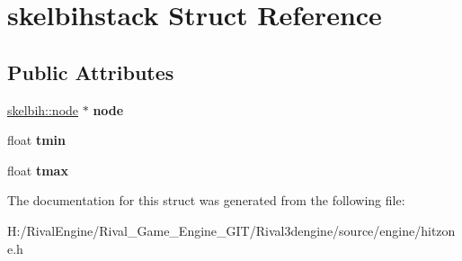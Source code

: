 \hypertarget{structskelbihstack}{}\section{skelbihstack Struct Reference}
\label{structskelbihstack}
\subsection*{Public Attributes}
\begin{DoxyCompactItemize}
\item 
\mbox{\label{structskelbihstack_a61d33e57026131190761a3480039d6e0}} 
\hyperlink{structskelbih_1_1node}{skelbih\+::node} $\ast$ {\bfseries node}
\item 
\mbox{\label{structskelbihstack_a89a0d9b0329a9e9db97fb8d0cb948114}} 
float {\bfseries tmin}
\item 
\mbox{\label{structskelbihstack_a134246276ef5901e9809059f6ac063de}} 
float {\bfseries tmax}
\end{DoxyCompactItemize}


The documentation for this struct was generated from the following file\+:\begin{DoxyCompactItemize}
\item 
H\+:/\+Rival\+Engine/\+Rival\+\_\+\+Game\+\_\+\+Engine\+\_\+\+G\+I\+T/\+Rival3dengine/source/engine/hitzone.\+h\end{DoxyCompactItemize}
